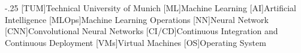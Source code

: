 \documentclass[headsepline,footsepline,footinclude=false,oneside,fontsize=11pt,paper=a4,listof=totoc,bibliography=totoc]{scrbook} %
\begin{document}


\frontmatter{}





\tableofcontents{}

\mainmatter{}







%
\appendix{}


\begin{acronym}
	\itemsep-.25\baselineskip
	[TUM]{Technical University of Munich}
	[ML]{Machine Learning}
	[AI]{Artificial Intelligence}
	[MLOps]{Machine Learning Operations}
	[NN]{Neural Network}
	[CNN]{Convolutional Neural Networks}
	[CI/CD]{Continuous Integration and Continuous Deployment}
	[VMs]{Virtual Machines}
	[OS]{Operating System}
\end{acronym}

\listoffigures{}
\listoftables{}
\printbibliography{}
\end{document}
